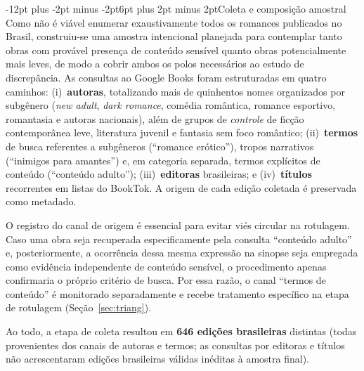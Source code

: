 \documentclass[12pt]{article}
\makeatletter
\renewcommand{\subsection}{\@startsection{subsection}{2}{\z@}%
  {-12pt plus -2pt minus -2pt}{6pt plus 2pt minus 2pt}{\normalfont\normalsize\bfseries}}
\makeatother
\begin{document}
\subsection{Coleta e composição amostral}
\label{sec:seed}
Como não é viável enumerar exaustivamente todos os romances publicados no Brasil, construiu-se uma amostra intencional planejada para contemplar tanto obras com provável presença de conteúdo sensível quanto obras potencialmente mais leves, de modo a cobrir ambos os polos necessários ao estudo de discrepância. As consultas ao Google Books foram estruturadas em quatro caminhos: (i)~\textbf{autoras}, totalizando mais de quinhentos nomes organizados por subgênero (\emph{new adult}, \emph{dark romance}, comédia romântica, romance esportivo, romantasia e autoras nacionais), além de grupos de \emph{controle} de ficção contemporânea leve, literatura juvenil e fantasia sem foco romântico; (ii)~\textbf{termos} de busca referentes a subgêneros (``romance erótico''), tropos narrativos (``inimigos para amantes'') e, em categoria separada, termos explícitos de conteúdo (``conteúdo adulto''); (iii)~\textbf{editoras} brasileiras; e (iv)~\textbf{títulos} recorrentes em listas do BookTok. A origem de cada edição coletada é preservada como metadado.

O registro do canal de origem é essencial para evitar viés circular na rotulagem. Caso uma obra seja recuperada especificamente pela consulta ``conteúdo adulto'' e, posteriormente, a ocorrência dessa mesma expressão na sinopse seja empregada como evidência independente de conteúdo sensível, o procedimento apenas confirmaria o próprio critério de busca. Por essa razão, o canal ``termos de conteúdo'' é monitorado separadamente e recebe tratamento específico na etapa de rotulagem (Seção~\ref{sec:triang}).

Ao todo, a etapa de coleta resultou em \textbf{646 edições brasileiras} distintas (todas provenientes dos canais de autoras e termos; as consultas por editoras e títulos não acrescentaram edições brasileiras válidas inéditas à amostra final).
\end{document}
